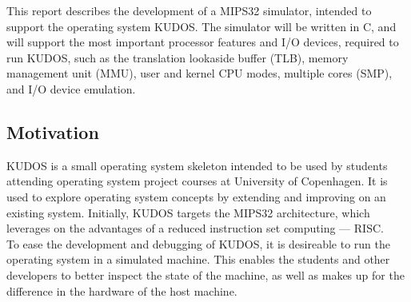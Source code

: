 This report describes the development of a MIPS32 simulator, intended to support
the operating system KUDOS. The simulator will be written in C, and will
support the most important processor features and I/O devices, required to run
KUDOS, such as the translation lookaside
buffer (TLB), memory management unit (MMU), user and kernel CPU modes,
multiple cores (SMP), and I/O device emulation. \\


\subsection{Motivation}
KUDOS is a small operating system skeleton intended to be used by students
attending operating system project courses at University of Copenhagen.
It is used to explore operating system concepts by extending and improving on
an existing system.
Initially, KUDOS targets the MIPS32 architecture, which leverages on the
advantages of a
reduced instruction set computing --- RISC.\\
To ease the development and debugging of KUDOS, it is desireable to run the
operating system
in a simulated machine. This enables the students and other developers to
better inspect the state of the machine, as well as makes up
for the difference in the hardware of the host machine.

